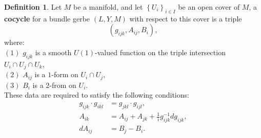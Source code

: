 \documentclass{article}
\theoremstyle{plain}
\theoremstyle{definition}
\newtheorem{defn}[thm]{Definition}
\begin{document}
\begin{defn}\cite[Section 1.1]{Wal2007phd}
Let $M$ be a manifold, and let $\left\{U_i\right\}_{i \in I}$ be an open cover of $M$, a \textbf{cocycle} for a bundle gerbe $(L,Y,M)$ with respect to this cover is a triple 
$$(g_{ijk},A_{ij},B_i),$$ where: \\
$(1)$ $g_{ijk}$ is a smooth $U(1)$-valued function on the triple intersection $U_i \cap U_j \cap U_k$, \\
$(2)$ $A_{ij}$ is a $1$-form on $U_i \cap U_j$, \\
$(3)$ $B_i$ is a $2$-from on $U_i$. \\
These data are required to satisfy the following conditions:
\begin{align*}
g_{ijk} \cdot g_{ikl} & = g_{jkl} \cdot g_{ijl}, \\
A_{ik} & = A_{ij} + A_{jk} + \frac{1}{\mathsf{i}} g^{-1}_{ijk}dg_{ijk}, \\
dA_{ij} & = B_j - B_i.
\end{align*}
\end{defn}
\end{document}
